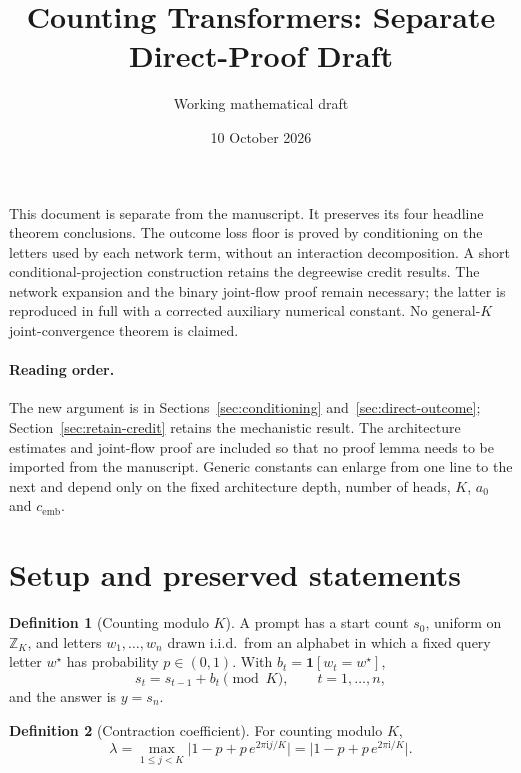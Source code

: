 \documentclass[11pt]{article}
\title{Counting Transformers: Separate Direct-Proof Draft}
\author{Working mathematical draft}
\date{10 October 2026}
\theoremstyle{definition}
\newtheorem{definition}{Definition}
\theoremstyle{remark}
\newcommand{\mixrate}{\lambda}
\begin{document}
\maketitle
\noindent This document is separate from the manuscript. It preserves its four headline theorem conclusions. The outcome loss floor is proved by conditioning on the letters used by each network term, without an interaction decomposition. A short conditional-projection construction retains the degreewise credit results. The network expansion and the binary joint-flow proof remain necessary; the latter is reproduced in full with a corrected auxiliary numerical constant. No general-$K$ joint-convergence theorem is claimed.

\paragraph{Reading order.} The new argument is in Sections~\ref{sec:conditioning} and~\ref{sec:direct-outcome}; Section~\ref{sec:retain-credit} retains the mechanistic result. The architecture estimates and joint-flow proof are included so that no proof lemma needs to be imported from the manuscript. Generic constants can enlarge from one line to the next and depend only on the fixed architecture depth, number of heads, $K$, $a_0$ and $c_{\mathrm{emb}}$.

\section{Setup and preserved statements}\label{sec:setting}
\begin{definition}[Counting modulo $K$]
\label{def:task}
A prompt has a start count $s_0$, uniform on $\mathbb Z_K$, and letters $w_1,\ldots,w_n$ drawn i.i.d.\ from an alphabet
in which a fixed query letter $w^\star$ has probability $p\in(0,1)$. With $b_t=\mathbf 1[w_t=w^\star]$,
\begin{equation}
 s_t=s_{t-1}+b_t\pmod K,\qquad t=1,\ldots,n,
 \label{eq:tracking}
\end{equation}
and the answer is $y=s_n$.
\end{definition}

\begin{definition}[Contraction coefficient]
\label{def:lambda}
For counting modulo $K$,
\begin{equation}
 \mixrate=\max_{1\le j<K}\bigl|1-p+p\,e^{2\pi\mathrm ij/K}\bigr|=\bigl|1-p+p\,e^{2\pi\mathrm i/K}\bigr|.
 \label{eq:lambda}
\end{equation}
\end{definition}
\end{document}
